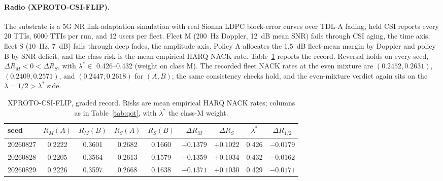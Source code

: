 \documentclass[11pt]{article}
\theoremstyle{definition}
\theoremstyle{remark}
\newcommand{\lamstar}{\lambda^{*}}
\begin{document}
\paragraph{Radio (XPROTO-CSI-FLIP).}
The substrate is a 5G NR link-adaptation simulation with real Sionna LDPC
block-error curves over TDL-A fading, held CSI reports every 20 TTIs, 6000
TTIs per run, and 12 users per fleet. Fleet M (200~Hz Doppler, 12~dB mean
SNR) fails through CSI aging, the time axis; fleet S (10~Hz, 7~dB) fails
through deep fades, the amplitude axis. Policy A allocates the 1.5~dB
fleet-mean margin by Doppler and policy B by SNR deficit, and the class risk
is the mean empirical HARQ NACK rate. Table~\ref{tab:csi} reports the
record. Reversal holds on every seed, $\Delta R_M < 0 < \Delta R_S$, with
$\lamstar \in$ 0.426--0.432 (weight on class M). The recorded fleet NACK
rates at the even mixture are $(0.2452, 0.2631)$, $(0.2409, 0.2571)$, and
$(0.2447, 0.2618)$ for $(A, B)$; the same consistency checks hold, and the
even-mixture verdict again sits on the $\lambda = 1/2 > \lamstar$ side.

\begin{table}[htbp]
\centering
\caption{XPROTO-CSI-FLIP, graded record. Risks are mean empirical HARQ NACK
rates; columns as in Table~\ref{tab:qot}, with $\lamstar$ the class-M
weight.}
\label{tab:csi}
\begin{tabular}{lcccccccc}
\toprule
seed & $R_M(A)$ & $R_M(B)$ & $R_S(A)$ & $R_S(B)$ & $\Delta R_M$ &
$\Delta R_S$ & $\lamstar$ & $\Delta R_{1/2}$ \\
\midrule
20260827 & 0.2222 & 0.3601 & 0.2682 & 0.1660 & $-0.1379$ & $+0.1022$ & 0.426 & $-0.0179$ \\
20260828 & 0.2205 & 0.3564 & 0.2613 & 0.1579 & $-0.1359$ & $+0.1034$ & 0.432 & $-0.0162$ \\
20260829 & 0.2226 & 0.3597 & 0.2668 & 0.1638 & $-0.1371$ & $+0.1030$ & 0.429 & $-0.0171$ \\
\bottomrule
\end{tabular}
\end{table}
\end{document}
